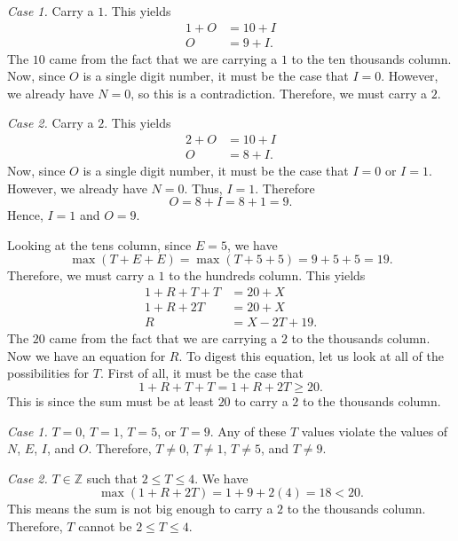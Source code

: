 \documentclass[12pt]{article}
\begin{document}
\noindent\textit{Case 1.} Carry a $1$. This yields
\begin{align*}
  1+O&=10+I\\
  O&=9+I.
\end{align*}
The $10$ came from the fact that we are carrying a $1$ to the ten thousands column. Now, since $O$ is a single digit number, it must be the case that $I=0$. However, we already have $N=0$, so this is a contradiction. Therefore, we must carry a $2$.
\vspace{20px}

\noindent\textit{Case 2.} Carry a $2$. This yields
\begin{align*}
  2+O&=10+I\\
  O&=8+I.
\end{align*}
Now, since $O$ is a single digit number, it must be the case that $I=0$ or $I=1$. However, we already have $N=0$. Thus, $I=1$. Therefore
\[O=8+I=8+1=9.\]
Hence, $\boxed{I=1}$ and $\boxed{O=9}$.
\newpage

\noindent Looking at the tens column, since $E=5$, we have
\[\max(T+E+E)=\max(T+5+5)=9+5+5=19.\]
Therefore, we must carry a $1$ to the hundreds column. This yields
\begin{align*}
  1+R+T+T&=20+X\\
  1+R+2T&=20+X\\
  R&=X-2T+19.
\end{align*}
The $20$ came from the fact that we are carrying a $2$ to the thousands column. Now we have an equation for $R$. To digest this equation, let us look at all of the possibilities for $T$. First of all, it must be the case that
\[1+R+T+T=1+R+2T\geq 20.\]
This is since the sum must be at least $20$ to carry a $2$ to the thousands column.
\vspace{20px}

\noindent\textit{Case 1.} $T=0$, $T=1$, $T=5$, or $T=9$. Any of these $T$ values violate the values of $N$, $E$, $I$, and $O$. Therefore, $T\neq 0$, $T\neq 1$, $T\neq 5$, and $T\neq 9$.
\vspace{20px}

\noindent\textit{Case 2.} $T\in\mathbb{Z}$ such that $2\leq T\leq 4$. We have
\[\max(1+R+2T)=1+9+2(4)=18<20.\]
This means the sum is not big enough to carry a $2$ to the thousands column. Therefore, $T$ cannot be $2\leq T\leq 4$.
\vspace{20px}
\end{document}
